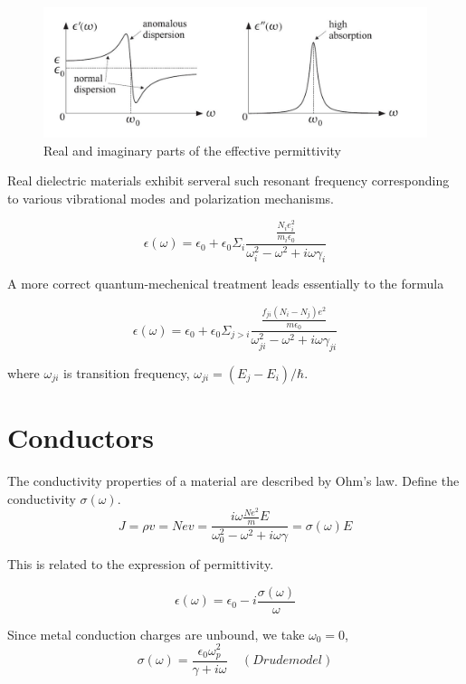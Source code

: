 \documentclass{article}
\begin{document}
		\begin{figure}
  		\includegraphics[width=\linewidth]{fig1.jpg}
  		\caption{Real and imaginary parts of the effective permittivity}
		\end{figure}

		Real dielectric materials exhibit serveral such resonant frequency corresponding to various vibrational modes and polarization mechanisms.

		\begin{equation}
			\epsilon(\omega) = \epsilon_{0} + \epsilon_{0}\Sigma_{i}\frac{\frac{N_{i}e_{i}^{2}}{m_{i}\epsilon_{0}}}{\omega_{i}^{2} - \omega^{2} + i\omega\gamma_{i}}
		\end{equation}

		A more correct quantum-mechenical treatment leads essentially to the formula

		\begin{equation}
			\epsilon(\omega) = \epsilon_{0} + \epsilon_{0}\Sigma_{j>i}\frac{\frac{f_{ji}(N_{i} - N_{j})e^{2}}{m\epsilon_{0}}}{\omega_{ji}^{2} - \omega^{2} + i\omega\gamma_{ji}}
		\end{equation}

		where $\omega_{ji}$ is transition frequency, $\omega_{ji} = (E_{j} - E_{i})/\hbar$.

	\section{Conductors}

		The conductivity properties of a material are described by Ohm’s law. Define the conductivity $\sigma(\omega)$.
		\begin{equation}
			J = \rho v = Nev = \frac{i\omega\frac{Ne^{2}}{m}E}{\omega_{0}^{2} - \omega^{2} + i\omega\gamma} = \sigma(\omega)E
		\end{equation}

		This is related to the expression of permittivity.

		\begin{equation}
			\epsilon(\omega) = \epsilon_{0} - i\frac{\sigma(\omega)}{\omega}
		\end{equation}

		Since metal conduction charges are unbound, we take $\omega_{0} = 0$,
		\begin{equation}
			\sigma(\omega) = \frac{\epsilon_{0}\omega_{p}^{2}}{\gamma + i\omega} \ \ \ \ \ (Drude model)
		\end{equation}
		
\end{document}
